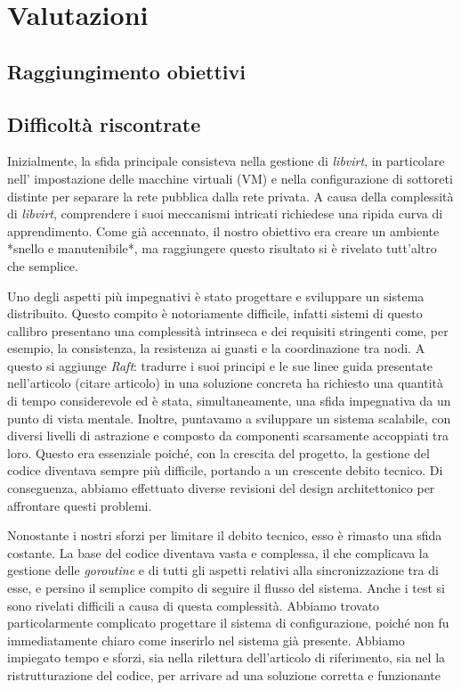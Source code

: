 
\section{Valutazioni}
\subsection{Raggiungimento obiettivi}

\subsection{Difficoltà riscontrate}
Inizialmente, la sfida principale consisteva nella gestione di \textit{libvirt}, in particolare nell'
impostazione delle macchine virtuali (VM) e nella configurazione di sottoreti distinte per separare la rete 
pubblica dalla rete privata. A causa della complessità di \textit{libvirt}, comprendere i suoi meccanismi 
intricati richiedese una ripida curva di apprendimento. Come già accennato, il nostro obiettivo era creare un 
ambiente *snello e manutenibile*, ma raggiungere questo risultato si è rivelato tutt'altro che semplice.

Uno degli aspetti più impegnativi è stato progettare e sviluppare un sistema distribuito. Questo compito è 
notoriamente difficile, infatti sistemi di questo callibro presentano una complessità 
intrinseca e dei requisiti stringenti come, per esempio, la consistenza, la resistenza ai guasti e la 
coordinazione tra nodi. A questo si aggiunge \textit{Raft}:
tradurre i suoi principi e le sue linee guida presentate nell'articolo (citare articolo) in una soluzione 
concreta ha richiesto una quantità di tempo considerevole ed è stata, simultaneamente, una sfida impegnativa da 
un punto di vista mentale.
Inoltre, puntavamo a sviluppare un sistema scalabile, con diversi livelli di astrazione e composto da 
componenti scarsamente accoppiati tra loro. Questo era essenziale poiché, 
con la crescita del progetto, la gestione del codice diventava sempre più difficile, portando a un crescente 
debito tecnico. Di conseguenza, abbiamo effettuato diverse revisioni del design architettonico per affrontare 
questi problemi.

Nonostante i nostri sforzi per limitare il debito tecnico, esso è rimasto una sfida costante. La base del codice 
diventava vasta e complessa, il che complicava la gestione delle \textit{goroutine} e di tutti gli aspetti 
relativi alla sincronizzazione tra di esse, e persino il semplice compito di seguire il flusso del sistema. 
Anche i test si sono rivelati difficili a causa di questa complessità. Abbiamo trovato particolarmente 
complicato progettare il sistema di configurazione, poiché non fu immediatamente chiaro come inserirlo nel 
sistema già presente. Abbiamo impiegato tempo e sforzi, sia nella rilettura dell'articolo di riferimento, sia nel
la ristrutturazione del codice, per arrivare ad una soluzione corretta e funzionante

